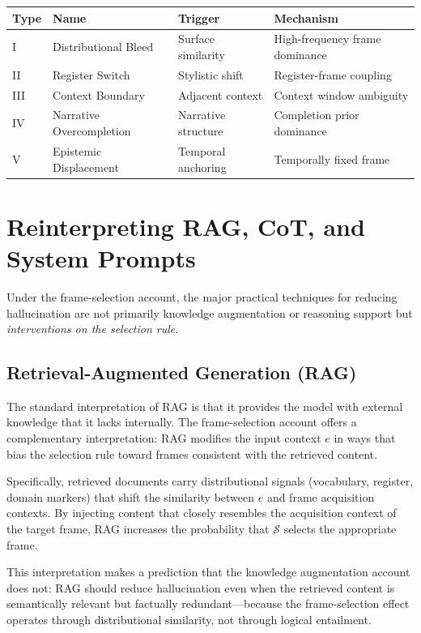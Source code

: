 \documentclass[12pt]{article}
\begin{document}
\begin{center}
\begin{tabular}{llll}
\toprule
Type & Name & Trigger & Mechanism \\
\midrule
I & Distributional Bleed & Surface similarity & High-frequency frame dominance \\
II & Register Switch & Stylistic shift & Register-frame coupling \\
III & Context Boundary & Adjacent context & Context window ambiguity \\
IV & Narrative Overcompletion & Narrative structure & Completion prior dominance \\
V & Epistemic Displacement & Temporal anchoring & Temporally fixed frame \\
\bottomrule
\end{tabular}
\end{center}

\section{Reinterpreting RAG, CoT, and System Prompts}

Under the frame-selection account, the major practical techniques
for reducing hallucination are not primarily knowledge augmentation
or reasoning support but \emph{interventions on the selection rule}.

\subsection{Retrieval-Augmented Generation (RAG)}

The standard interpretation of RAG is that it provides the model
with external knowledge that it lacks internally. The frame-selection
account offers a complementary interpretation: RAG modifies the
input context $e$ in ways that bias the selection rule toward
frames consistent with the retrieved content.

Specifically, retrieved documents carry distributional signals
(vocabulary, register, domain markers) that shift the similarity
between $e$ and frame acquisition contexts. By injecting content
that closely resembles the acquisition context of the target frame,
RAG increases the probability that $\mathcal{S}$ selects the
appropriate frame.

This interpretation makes a prediction that the knowledge
augmentation account does not: RAG should reduce hallucination
even when the retrieved content is semantically relevant but
factually redundant---because the frame-selection effect operates
through distributional similarity, not through logical entailment.
\end{document}
